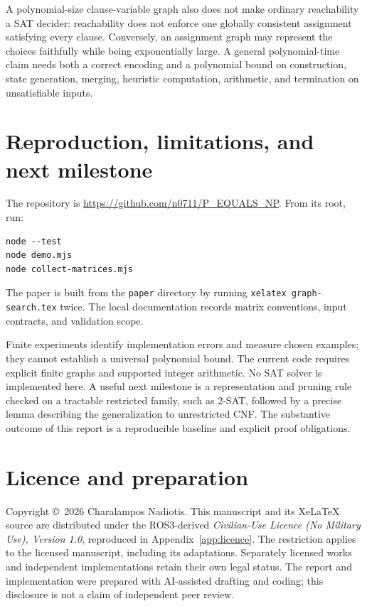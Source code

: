 \documentclass[11pt,a4paper]{article}
\begin{document}
A polynomial-size clause-variable graph also does not make ordinary reachability a SAT decider: reachability does not enforce one globally consistent assignment satisfying every clause. Conversely, an assignment graph may represent the choices faithfully while being exponentially large. A general polynomial-time claim needs both a correct encoding and a polynomial bound on construction, state generation, merging, heuristic computation, arithmetic, and termination on unsatisfiable inputs.

\section{Reproduction, limitations, and next milestone}
The repository is \url{https://github.com/n0711/P_EQUALS_NP}. From its root, run:
\begin{verbatim}
node --test
node demo.mjs
node collect-matrices.mjs
\end{verbatim}
The paper is built from the \texttt{paper} directory by running \texttt{xelatex graph-search.tex} twice. The local documentation records matrix conventions, input contracts, and validation scope.

Finite experiments identify implementation errors and measure chosen examples; they cannot establish a universal polynomial bound. The current code requires explicit finite graphs and supported integer arithmetic. No SAT solver is implemented here. A useful next milestone is a representation and pruning rule checked on a tractable restricted family, such as 2-SAT, followed by a precise lemma describing the generalization to unrestricted CNF. The substantive outcome of this report is a reproducible baseline and explicit proof obligations.

\section*{Licence and preparation}
Copyright \copyright\ 2026 Charalampos Nadiotis. This manuscript and its XeLaTeX source are distributed under the ROS3-derived \emph{Civilian-Use Licence (No Military Use), Version 1.0}, reproduced in Appendix~\ref{app:licence}. The restriction applies to the licensed manuscript, including its adaptations. Separately licensed works and independent implementations retain their own legal status. The report and implementation were prepared with AI-assisted drafting and coding; this disclosure is not a claim of independent peer review.
\end{document}
